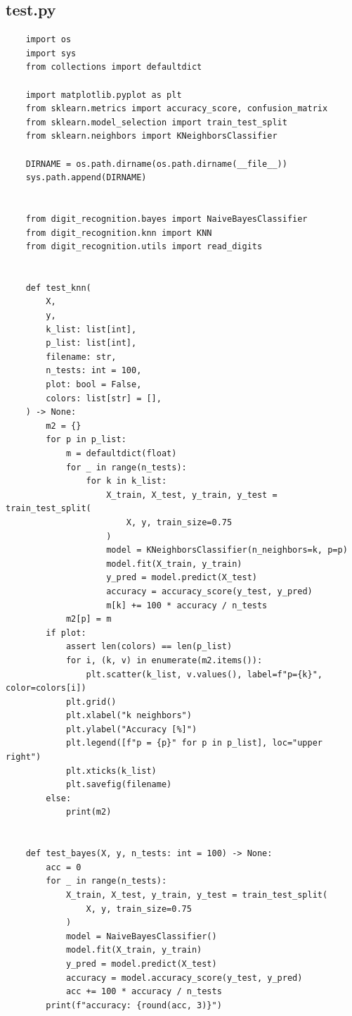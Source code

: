 \documentclass[12pt,a4paper]{article}
\begin{document}
\subsection{test.py}
\begin{lstlisting}
	import os
	import sys
	from collections import defaultdict
	
	import matplotlib.pyplot as plt
	from sklearn.metrics import accuracy_score, confusion_matrix
	from sklearn.model_selection import train_test_split
	from sklearn.neighbors import KNeighborsClassifier
	
	DIRNAME = os.path.dirname(os.path.dirname(__file__))
	sys.path.append(DIRNAME)
	
	
	from digit_recognition.bayes import NaiveBayesClassifier
	from digit_recognition.knn import KNN
	from digit_recognition.utils import read_digits
	
	
	def test_knn(
		X,
		y,
		k_list: list[int],
		p_list: list[int],
		filename: str,
		n_tests: int = 100,
		plot: bool = False,
		colors: list[str] = [],
	) -> None:
		m2 = {}
		for p in p_list:
			m = defaultdict(float)
			for _ in range(n_tests):
				for k in k_list:
					X_train, X_test, y_train, y_test = train_test_split(
						X, y, train_size=0.75
					)
					model = KNeighborsClassifier(n_neighbors=k, p=p)
					model.fit(X_train, y_train)
					y_pred = model.predict(X_test)
					accuracy = accuracy_score(y_test, y_pred)
					m[k] += 100 * accuracy / n_tests
			m2[p] = m
		if plot:
			assert len(colors) == len(p_list)
			for i, (k, v) in enumerate(m2.items()):
				plt.scatter(k_list, v.values(), label=f"p={k}", color=colors[i])
			plt.grid()
			plt.xlabel("k neighbors")
			plt.ylabel("Accuracy [%]")
			plt.legend([f"p = {p}" for p in p_list], loc="upper right")
			plt.xticks(k_list)
			plt.savefig(filename)
		else:
			print(m2)
	
	
	def test_bayes(X, y, n_tests: int = 100) -> None:
		acc = 0
		for _ in range(n_tests):
			X_train, X_test, y_train, y_test = train_test_split(
				X, y, train_size=0.75
			)
			model = NaiveBayesClassifier()
			model.fit(X_train, y_train)
			y_pred = model.predict(X_test)
			accuracy = model.accuracy_score(y_test, y_pred)
			acc += 100 * accuracy / n_tests
		print(f"accuracy: {round(acc, 3)}")
\end{lstlisting}
\end{document}
